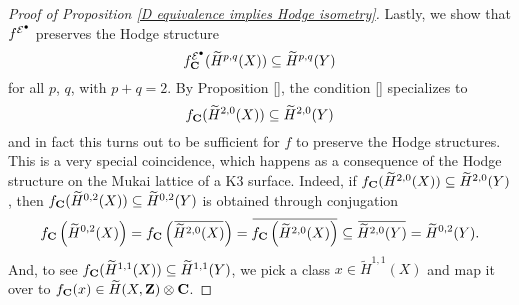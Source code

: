 \begin{proof}[Proof of Proposition \ref{D equivalence implies Hodge isometry}]
    Lastly, we show that $f^{\mathcal E^\bullet}$ preserves the Hodge structure \ie
    \[
        f^{\mathcal E^\bullet}_\mathbf C(\widetilde{H}^{p,q}(X)) \subseteq \widetilde{H}^{p,q}(Y) 
    \]
    for all $p$, $q$, with $p + q = 2$. 
    By Proposition \ref{}, the condition \eqref{} specializes to 
    \[
        f_\mathbf C(\widetilde{H}^{2,0}(X)) \subseteq \widetilde{H}^{2,0}(Y)
    \]
    and in fact this turns out to be sufficient for $f$ to preserve the Hodge structures. This is a very special coincidence, which happens as a consequence of the Hodge structure on the Mukai lattice of a K3 surface.
    Indeed, if $f_\mathbf C(\widetilde{H}^{2,0}(X)) \subseteq \widetilde{H}^{2,0}(Y)$, then $f_\mathbf C(\widetilde{H}^{0,2}(X)) \subseteq \widetilde{H}^{0,2}(Y)$ is obtained through conjugation
    \[
        f_\C\left(\widetilde{H}^{0,2}(X)\right) = f_\C\left(\ols{\widetilde{H}^{2,0}(X)}\right) = \ols{f_\C\left(\widetilde{H}^{2,0}(X)\right)} \subseteq \ols{\widetilde{H}^{2,0}(Y)} = \widetilde{H}^{0,2}(Y).
    \]
    And, to see $f_\mathbf C(\widetilde{H}^{1,1}(X)) \subseteq \widetilde{H}^{1,1}(Y)$, we pick a class $x \in \widetilde{H}^{1,1}(X)$ and map it over to $f_\mathbf C(x) \in \widetilde{H}(X, \mathbf Z) \otimes \mathbf C$.
    
\end{proof}
